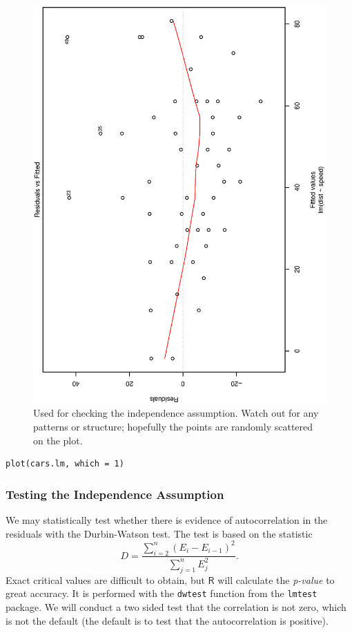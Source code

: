 \documentclass[captions=tableheading]{scrbook}
\begin{document}
\begin{figure}[th]
  \includegraphics[angle=270, totalheight=4in]{ps/slr/resids-fitted-cars.ps}
  \caption[Plot of the residuals versus the fitted values for the \texttt{cars}
data]{\small Used for checking the independence assumption. Watch out for any patterns or structure; hopefully the points are randomly scattered on the plot.}
  \label{fig-resids-fitted-cars}
\end{figure}



\begin{verbatim}
plot(cars.lm, which = 1)
\end{verbatim}
\subsubsection{Testing the Independence Assumption}
\label{sec-11-4-3-1}


We may statistically test whether there is evidence of autocorrelation in the residuals with the Durbin-Watson test. The test is based on the statistic
\begin{equation}
D=\frac{\sum_{i=2}^{n}(E_{i}-E_{i-1})^{2}}{\sum_{j=1}^{n}E_{j}^{2}}.
\end{equation}
Exact critical values are difficult to obtain, but \(\mathsf{R}\) will calculate the \emph{p-value} to great accuracy. It is performed with the \texttt{dwtest} function from the \texttt{lmtest} package. We will conduct a two sided test that the correlation is not zero, which is not the default (the default is to test that the autocorrelation is positive).
\end{document}
